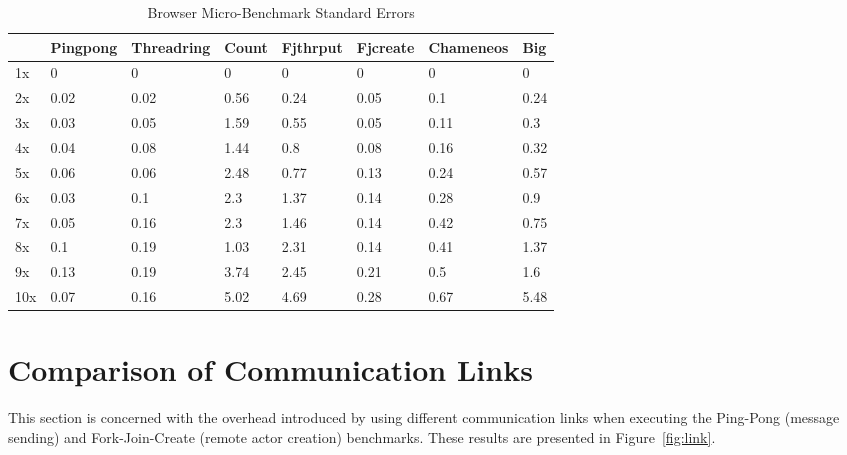 \documentclass[oneside]{um-fict}
\begin{document}
\begin{table}[H]
    \begin{center}
        \begin{tabular}{|l|lllllll|}
        \hline
        & Pingpong & Threadring & Count & Fjthrput & Fjcreate & Chameneos & Big  \\ \hline
        1x  & 0        & 0          & 0     & 0        & 0        & 0         & 0    \\
        2x  & 0.02     & 0.02       & 0.56  & 0.24     & 0.05     & 0.1       & 0.24 \\
        3x  & 0.03     & 0.05       & 1.59  & 0.55     & 0.05     & 0.11      & 0.3  \\
        4x  & 0.04     & 0.08       & 1.44  & 0.8      & 0.08     & 0.16      & 0.32 \\
        5x  & 0.06     & 0.06       & 2.48  & 0.77     & 0.13     & 0.24      & 0.57 \\
        6x  & 0.03     & 0.1        & 2.3   & 1.37     & 0.14     & 0.28      & 0.9  \\
        7x  & 0.05     & 0.16       & 2.3   & 1.46     & 0.14     & 0.42      & 0.75 \\
        8x  & 0.1      & 0.19       & 1.03  & 2.31     & 0.14     & 0.41      & 1.37 \\
        9x  & 0.13     & 0.19       & 3.74  & 2.45     & 0.21     & 0.5       & 1.6  \\
        10x & 0.07     & 0.16       & 5.02  & 4.69     & 0.28     & 0.67      & 5.48 \\ \hline
        \end{tabular}
        \caption{Browser Micro-Benchmark Standard Errors}\label{tab:browserloadscalingsem}
    \end{center}
\end{table}
\section{Comparison of Communication Links}
This section is concerned with the overhead introduced by using different communication links when executing the Ping-Pong (message sending) and Fork-Join-Create (remote actor creation) benchmarks. These results are presented in Figure~\ref{fig:link}.
\end{document}
